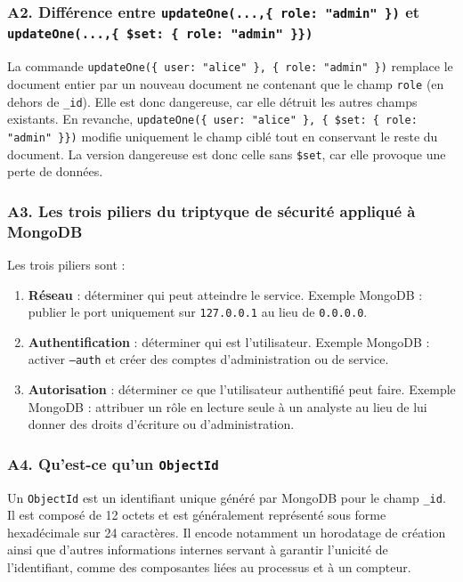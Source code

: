 \documentclass[11pt,a4paper]{article}
\begin{document}
\subsubsection*{A2. Différence entre \texttt{updateOne(...,\{ role: "admin" \})} et \texttt{updateOne(...,\{ \$set: \{ role: "admin" \}\})}}

La commande \texttt{updateOne(\{ user: "alice" \}, \{ role: "admin" \})} remplace le document entier par un nouveau document ne contenant que le champ \texttt{role} (en dehors de \texttt{\_id}). Elle est donc dangereuse, car elle détruit les autres champs existants. En revanche, \texttt{updateOne(\{ user: "alice" \}, \{ \$set: \{ role: "admin" \}\})} modifie uniquement le champ ciblé tout en conservant le reste du document. La version dangereuse est donc celle sans \texttt{\$set}, car elle provoque une perte de données.

\subsubsection*{A3. Les trois piliers du triptyque de sécurité appliqué à MongoDB}

Les trois piliers sont :
\begin{enumerate}[label=\arabic*)]
  \item \textbf{Réseau} : déterminer qui peut atteindre le service. Exemple MongoDB : publier le port uniquement sur \texttt{127.0.0.1} au lieu de \texttt{0.0.0.0}.
  \item \textbf{Authentification} : déterminer qui est l'utilisateur. Exemple MongoDB : activer \texttt{--auth} et créer des comptes d'administration ou de service.
  \item \textbf{Autorisation} : déterminer ce que l'utilisateur authentifié peut faire. Exemple MongoDB : attribuer un rôle en lecture seule à un analyste au lieu de lui donner des droits d'écriture ou d'administration.
\end{enumerate}

\subsubsection*{A4. Qu'est-ce qu'un \texttt{ObjectId}}

Un \texttt{ObjectId} est un identifiant unique généré par MongoDB pour le champ \texttt{\_id}. Il est composé de 12 octets et est généralement représenté sous forme hexadécimale sur 24 caractères. Il encode notamment un horodatage de création ainsi que d'autres informations internes servant à garantir l'unicité de l'identifiant, comme des composantes liées au processus et à un compteur.
\end{document}
